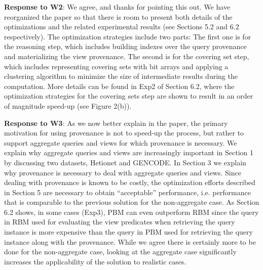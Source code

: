 \begin{appendix}
\textbf{Response to W2}:
We agree, and thanks for pointing this out. We have reorganized the paper so that there is room to present both details of the optimizations and the related experimental results (see Sections 5.2 and 6.2 respectively). The optimization strategies include two parts: The first one is for the reasoning step, which includes building indexes over the query provenance and materializing the view provenance.  The second is for the covering set step, which includes representing covering sets with bit arrays and applying a clustering algorithm to minimize the size of intermediate results during the computation. More details can be found in Exp2 of Section 6.2, where the optimization strategies for the covering sets step are shown to result in an order of magnitude speed-up (see Figure 2(b)).

\textbf{Response to W3}: 
As we now better explain in the paper, the primary motivation for using provenance is not to speed-up the process, but rather to support aggregate queries and views for which provenance is necessary. We explain why aggregate queries and views are increasingly important in Section 1 by discussing two datasets, Hetionet and GENCODE.  In Section 3 we explain why provenance is necessary to deal with aggregate queries and views.  Since dealing with provenance is known to be costly, the optimization efforts described in Section 5 are necessary to obtain ``acceptable'' performance, i.e. performance that is comparable to the previous solution for the non-aggregate case. As Section 6.2 shows, in some cases (Exp3), PBM can even outperform RBM since the query in RBM used for evaluating the view predicates when retrieving the query instance is more expensive than the query in PBM used for retrieving the query instance along with the provenance.
While we agree there is certainly more to be done for the non-aggregate case, looking at the aggregate case significantly increases the applicability of the solution to realistic cases. 



\end{appendix}
